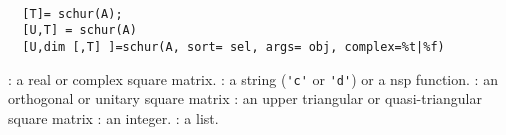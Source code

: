 
\begin{mandesc}
   \\ %
\end{mandesc}
\begin{calling_sequence}
\begin{verbatim}
  [T]= schur(A);
  [U,T] = schur(A)   
  [U,dim [,T] ]=schur(A, sort= sel, args= obj, complex=%t|%f)
\end{verbatim}
\end{calling_sequence}
\begin{parameters}
  \begin{varlist}
    : a real or complex square matrix.
    : a string (\verb!'c'! or \verb!'d'!) or a nsp function.
    : an orthogonal or unitary square matrix
    : an upper triangular or quasi-triangular square matrix
    : an integer.
    : a list.
  \end{varlist}
\end{parameters}
